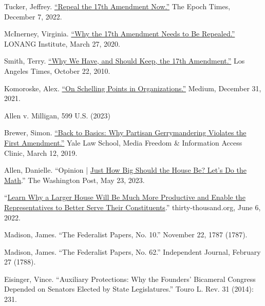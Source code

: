\documentclass{article}
\newcommand{\quotes}[1]{``#1''}
\begin{document}
\begin{thebibliography}{20}
Tucker, Jeffrey. \href{https://www.theepochtimes.com/repeal-the-17th-amendment-now\_4909126.html}{\quotes{Repeal the 17th Amendment Now.}} The Epoch Times, December 7, 2022.

McInerney, Virginia. \href{https://lonang.com/commentaries/conlaw/federalism/repeal-seventeenth-amendment/}{\quotes{Why the 17th Amendment Needs to Be Repealed.}} LONANG Institute, March 27, 2020.

Smith, Terry. \href{https://www.latimes.com/archives/la-xpm-2010-oct-22-la-oew-smith-17th-amendment-20101022-story.html}{\quotes{Why We Have, and Should Keep, the 17th Amendment.}} Los Angeles Times, October 22, 2010.

Komoroske, Alex. \href{https://medium.com/@komorama/on-schelling-points-in-organizations-e90647cdd81b}{\quotes{On Schelling Points in Organizations.}} Medium, December 31, 2021.

Allen v. Milligan, 599 U.S. (2023)

Brewer, Simon. \href{https://law.yale.edu/mfia/case-disclosed/back-basics-why-partisan-gerrymandering-violates-first-amendment}{\quotes{Back to Basics: Why Partisan Gerrymandering Violates the First Amendment.}} Yale Law School, Media Freedom \& Information Access Clinic, March 12, 2019.

Allen, Danielle. \quotes{Opinion | \href{https://www.washingtonpost.com/opinions/2023/03/28/danielle-allen-democracy-reform-house-representatives-districts/}{Just How Big Should the House Be? Let’s Do the Math}.} The Washington Post, May 23, 2023. 

 \quotes{\href{https://thirty-thousand.org/the-house-of-representatives-is-scalable/}{Learn Why a Larger House Will Be Much More Productive and Enable the Representatives to Better Serve Their Constituents}.} thirty-thousand.org, June 6, 2022.

Madison, James. \quotes{The Federalist Papers, No. 10.} November 22, 1787 (1787).

Madison, James. \quotes{The Federalist Papers, No. 62.} Independent Journal, February 27 (1788).

Eisinger, Vince. \quotes{Auxiliary Protections: Why the Founders' Bicameral Congress Depended on Senators Elected by State Legislatures.} Touro L. Rev. 31 (2014): 231.


\end{thebibliography}
\end{document}
